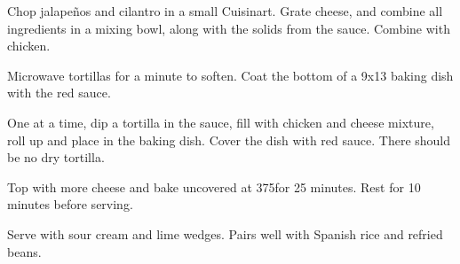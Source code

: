 \begin{recipe}

Chop jalapeños and cilantro in a small Cuisinart. Grate cheese, and combine all ingredients in a mixing bowl, along with the solids from the sauce. Combine with chicken.


Microwave tortillas for a minute to soften. Coat the bottom of a 9x13 baking dish with the red sauce.

One at a time, dip a tortilla in the sauce, fill with chicken and cheese mixture, roll up and place in the baking dish. Cover the dish with red sauce. There should be no dry tortilla.

Top with more cheese and bake uncovered at 375\degree for 25 minutes. Rest for 10 minutes before serving.

Serve with sour cream and lime wedges. Pairs well with Spanish rice and refried beans.

\end{recipe}
